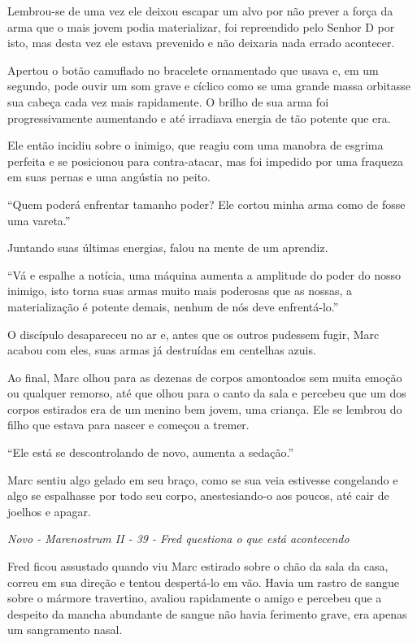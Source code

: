 Lembrou-se de uma vez ele deixou escapar um alvo por não prever a força
da arma que o mais jovem podia materializar, foi repreendido pelo Senhor
D por isto, mas desta vez ele estava prevenido e não deixaria nada
errado acontecer.

Apertou o botão camuflado no bracelete ornamentado que usava e, em um
segundo, pode ouvir um som grave e cíclico como se uma grande massa
orbitasse sua cabeça cada vez mais rapidamente. O brilho de sua arma foi
progressivamente aumentando e até irradiava energia de tão potente que
era.

Ele então incidiu sobre o inimigo, que reagiu com uma manobra de esgrima
perfeita e se posicionou para contra-atacar, mas foi impedido por uma
fraqueza em suas pernas e uma angústia no peito.

``Quem poderá enfrentar tamanho poder? Ele cortou minha arma como de
fosse uma vareta.''

Juntando suas últimas energias, falou na mente de um aprendiz.

``Vá e espalhe a notícia, uma máquina aumenta a amplitude do poder do
nosso inimigo, isto torna suas armas muito mais poderosas que as nossas,
a materialização é potente demais, nenhum de nós deve enfrentá-lo.''

O discípulo desapareceu no ar e, antes que os outros pudessem fugir,
Marc acabou com eles, suas armas já destruídas em centelhas azuis.

Ao final, Marc olhou para as dezenas de corpos amontoados sem muita
emoção ou qualquer remorso, até que olhou para o canto da sala e
percebeu que um dos corpos estirados era de um menino bem jovem, uma
criança. Ele se lembrou do filho que estava para nascer e começou a
tremer.

``Ele está se descontrolando de novo, aumenta a sedação.''

Marc sentiu algo gelado em seu braço, como se sua veia estivesse
congelando e algo se espalhasse por todo seu corpo, anestesiando-o aos
poucos, até cair de joelhos e apagar.

\asterisc

\emph{Novo - Marenostrum II - 39 - Fred questiona o que está
acontecendo}

Fred ficou assustado quando viu Marc estirado sobre o chão da sala da
casa, correu em sua direção e tentou despertá-lo em vão. Havia um rastro
de sangue sobre o mármore travertino, avaliou rapidamente o amigo e
percebeu que a despeito da mancha abundante de sangue não havia
ferimento grave, era apenas um sangramento nasal.

